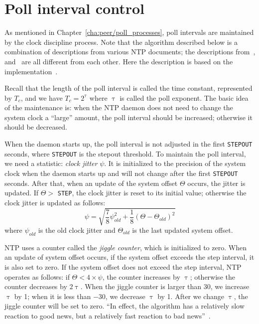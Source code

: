 \section{Poll interval control}%
\label{sec:poll_interval_control}
As mentioned in Chapter~\ref{cha:peer/poll_processes}, poll intervals are
maintained by the clock discipline process. Note that the algorithm described
below is a combination of descriptions from various NTP documents; the
descriptions from~\cite{redbook}, \cite{poll_process} and~\cite{rfc5905} are
all different from each other. Here the description is based on the
implementation~\cite{source_code}.

Recall that the length of the poll interval is called the time constant,
represented by $T_c$, and we have $T_c = 2^\uptau$ where $\uptau$ is called the
poll exponent. The basic idea of the maintenance is: when the NTP daemon does
not need to change the system clock a ``large'' amount, the poll interval
should be increased; otherwise it should be decreased.

When the daemon starts up, the poll interval is not adjusted in the first
\verb|STEPOUT| seconds, where \verb|STEPOUT| is the stepout threshold.
To maintain the poll interval, we need a statistic: \emph{clock jitter} $\psi$.
It is initialized to the precision of the system clock when the daemon starts
up and will not change after the first \verb|STEPOUT| seconds. After that, when
an update of the system offset $\Theta$ occurs, the jitter is updated. If
$\Theta > $ \verb|STEP|, the clock jitter is reset to its initial value;
otherwise the clock jitter is updated as follows:
\begin{equation}
    \psi = \sqrt{ \frac{7}{8}\psi_{old}^2 + \frac{1}{8}\left(\Theta -
    \Theta_{old}\right)^2 }
    \label{eq:clock_jitter}
\end{equation}
where $\psi_{old}$ is the old clock jitter and $\Theta_{old}$ is the last
updated system offset. 

NTP uses a counter called the \emph{jiggle counter}, which is initialized to
zero. When an update of system offset occurs, if the system offset exceeds the step
interval, it is also set to zero. If the system offset does not exceed the
step interval, NTP operates as follows:
if $\Theta < 4 \times \psi$, the counter increases by $\uptau$; 
otherwise the counter decreases by $2\uptau$.
When the jiggle counter is larger than 30, we increase $\uptau$ by 1; when it
is less than $-30$, we decrease $\uptau$ by 1. After we change $\uptau$, the
jiggle counter will be set to zero. ``In effect, the algorithm has a relatively
slow reaction to good news, but a relatively fast reaction to bad
news''~\cite{poll_process}.



